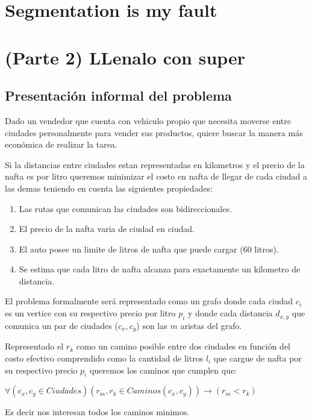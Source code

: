 \documentclass[12pt]{article}
\begin{document}
\section{Segmentation is my fault}



\section*{(Parte 2) LLenalo con super}

\subsection*{Presentación informal del problema}
Dado un vendedor que cuenta con vehiculo propio que necesita moverse entre ciudades personalmente para vender sus productos, quiere buscar la manera más económica de realizar la tarea.

Si la distancias entre ciudades estan representadas en kilometros y el precio de la nafta es por litro queremos minimizar el costo en nafta de llegar de cada ciudad a las demas teniendo en cuenta las siguientes propiedades: 

\begin{enumerate}
	\item Las rutas que comunican las ciudades son bidireccionales.
	\item El precio de la nafta varia de ciudad en ciudad.
	\item El auto posee un limite de litros de nafta que puede cargar (60 litros).
	\item Se estima que cada litro de nafta alcanza para exactamente un kilometro de distancia.
\end{enumerate}

El problema formalmente será representado como un grafo donde cada ciudad $c_i$ es un vertice con su respectivo precio por litro $p_i$ y donde cada distancia $d_{x,y}$ que comunica un par de ciudades ($c_x, c_y$) son las $m$ aristas del grafo.

Representado el $r_k$ como un camino posible entre dos ciudades en función del costo efectivo comprendido como la cantidad de litros $l_i$ que cargue de nafta por su respectivo precio $p_i$ queremos los caminos que cumplen que:

$\forall(c_x, c_y \in Ciudades)(r_{m}, r_k \in Caminos(c_x,c_y))\rightarrow(r_{m} < r_k)$

Es decir nos interesan todos los caminos minimos.
\end{document}
